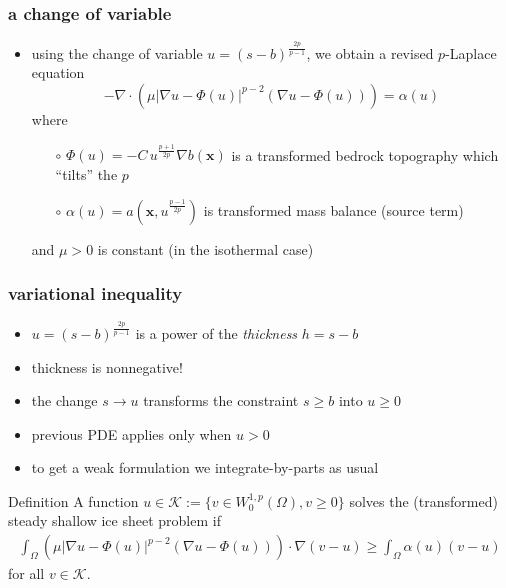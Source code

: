 \documentclass{beamer}
\newcommand{\Kcal}{\mathcal{K}}
\newcommand{\bx}{\mathbf{x}}
\newcommand{\Div}{\nabla\cdot}
\begin{document}
\begin{frame}
  \frametitle{a change of variable}
 
\begin{itemize}
\item using the change of variable  $u=(s-b)^{ \frac{2p}{p-1}}$, we obtain a revised $p$-Laplace equation
\begin{equation*}
 -  \Div \left( \mu  | \nabla u - \Phi(u) |^{p-2}
  ( \nabla u - \Phi(u) )  \right)  = \alpha(u)
\end{equation*}
where
  \begin{itemize}
  \item[$\circ$]  $\Phi(u) = - C \, u^{\frac{p+1}{2p}} \nabla b(\bx)$ is a transformed bedrock topography which ``tilts'' the $p$
  \item[$\circ$]  $\alpha(u) = a(\bx,u^{\frac{p-1}{2p}} )$ is transformed mass balance (source term)
  \end{itemize}
and $\mu>0$ is constant (in the isothermal case)
\end{itemize}
\end{frame}


\begin{frame}
  \frametitle{ variational inequality } 

\begin{itemize}
\item $u=(s-b)^{ \frac{2p}{p-1}}$ is a power of the \emph{thickness} $h=s-b$
\item thickness is nonnegative!
\item the change $s \to u$ transforms the constraint $s \ge b$ into $u \ge 0$
\item previous PDE applies only when $u>0$
\item to get a weak formulation we integrate-by-parts as usual
\end{itemize}

\begin{block}{Definition} 
A function $u \in \Kcal := \{ v \in W^{1,p}_0 (\Omega), v \ge 0 \}$ 
solves the (transformed) steady shallow ice sheet problem if
\begin{align*}
\int_{\Omega}    \left( \mu  | \nabla u - \Phi(u) |^{p-2} 
( \nabla u - \Phi(u) )    \right)  \cdot \nabla ( v - u )  
\ge \int_{\Omega} \alpha(u) (  v -  u ) 
\end{align*}
for all $v \in \Kcal$.
\end{block}
\end{frame}
\end{document}
